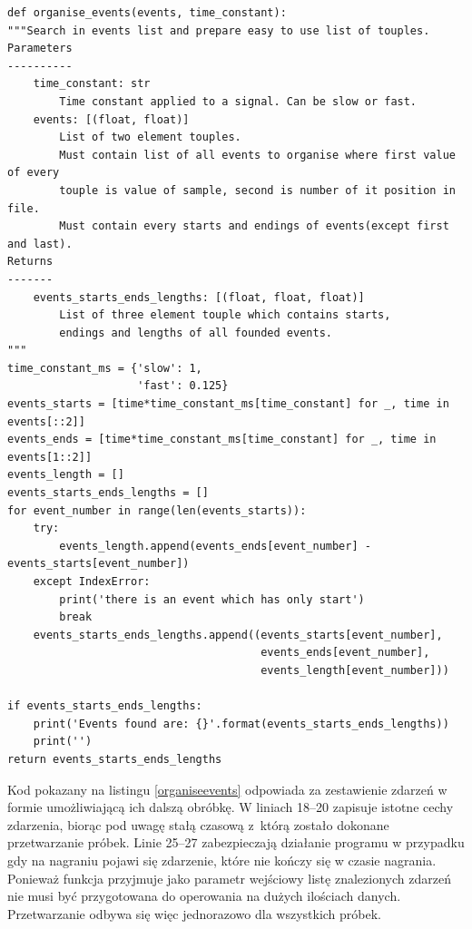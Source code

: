 \documentclass[eng,printmode]{mgr}
\begin{document}
\begin{minipage}{\linewidth}
\begin{lstlisting}[caption={fragment kodu źródłowego pliku Detectors.py, klasa EventsOrganiser,\newline metoda organise\_events},captionpos=b,label={organiseevents}]  
    def organise_events(events, time_constant):
"""Search in events list and prepare easy to use list of touples.
Parameters
----------
    time_constant: str
        Time constant applied to a signal. Can be slow or fast.
    events: [(float, float)]
        List of two element touples.
        Must contain list of all events to organise where first value of every
        touple is value of sample, second is number of it position in file.
        Must contain every starts and endings of events(except first and last).
Returns
-------
    events_starts_ends_lengths: [(float, float, float)]
        List of three element touple which contains starts,
        endings and lengths of all founded events.
"""
time_constant_ms = {'slow': 1,
                    'fast': 0.125}
events_starts = [time*time_constant_ms[time_constant] for _, time in events[::2]]
events_ends = [time*time_constant_ms[time_constant] for _, time in events[1::2]]
events_length = []
events_starts_ends_lengths = []
for event_number in range(len(events_starts)):
    try:
        events_length.append(events_ends[event_number] - events_starts[event_number])
    except IndexError:
        print('there is an event which has only start')
        break
    events_starts_ends_lengths.append((events_starts[event_number],
                                       events_ends[event_number],
                                       events_length[event_number]))

if events_starts_ends_lengths:
    print('Events found are: {}'.format(events_starts_ends_lengths))
    print('')
return events_starts_ends_lengths
\end{lstlisting}
\end{minipage}

Kod pokazany na listingu \ref{organiseevents} odpowiada za zestawienie zdarzeń w formie umożliwiającą ich dalszą obróbkę. W liniach 18--20 zapisuje istotne cechy zdarzenia, biorąc pod uwagę stałą czasową  z~którą zostało dokonane przetwarzanie próbek. Linie 25--27 zabezpieczają działanie programu w przypadku gdy na nagraniu pojawi się zdarzenie, które nie kończy się w czasie nagrania. Ponieważ funkcja przyjmuje jako parametr wejściowy listę znalezionych zdarzeń nie musi być przygotowana do operowania na dużych ilościach danych. Przetwarzanie odbywa się więc jednorazowo dla wszystkich próbek. 
\end{document}
